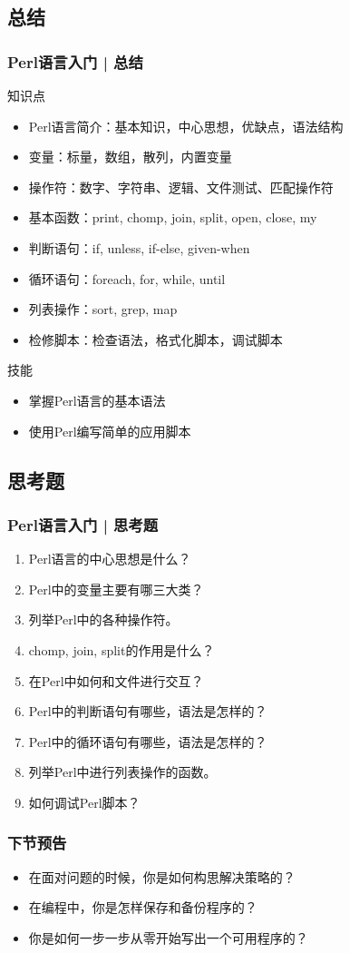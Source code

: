 \subsection{总结}
\begin{frame}
  \frametitle{Perl语言入门 | 总结}
  \begin{block}{知识点}
    \begin{itemize}
      \item Perl语言简介：基本知识，中心思想，优缺点，语法结构
      \item 变量：标量，数组，散列，内置变量
      \item 操作符：数字、字符串、逻辑、文件测试、匹配操作符
      \item 基本函数：print, chomp, join, split, open, close, my
      \item 判断语句：if, unless, if-else, given-when
      \item 循环语句：foreach, for, while, until
      \item 列表操作：sort, grep, map
      \item 检修脚本：检查语法，格式化脚本，调试脚本
    \end{itemize}
  \end{block}
  \begin{block}{技能}
    \begin{itemize}
      \item 掌握Perl语言的基本语法
      \item 使用Perl编写简单的应用脚本
    \end{itemize}
  \end{block}
\end{frame}

\subsection{思考题}
\begin{frame}
  \frametitle{Perl语言入门 | 思考题}
  \begin{enumerate}
    \item Perl语言的中心思想是什么？
    \item Perl中的变量主要有哪三大类？
    \item 列举Perl中的各种操作符。
    \item chomp, join, split的作用是什么？
    \item 在Perl中如何和文件进行交互？
    \item Perl中的判断语句有哪些，语法是怎样的？
    \item Perl中的循环语句有哪些，语法是怎样的？
    \item 列举Perl中进行列表操作的函数。
    \item 如何调试Perl脚本？
  \end{enumerate}
\end{frame}

\begin{frame}
  \frametitle{下节预告}
  \begin{itemize}
    \item 在面对问题的时候，你是如何构思解决策略的？
    \item 在编程中，你是怎样保存和备份程序的？
    \item 你是如何一步一步从零开始写出一个可用程序的？
  \end{itemize}
\end{frame}



